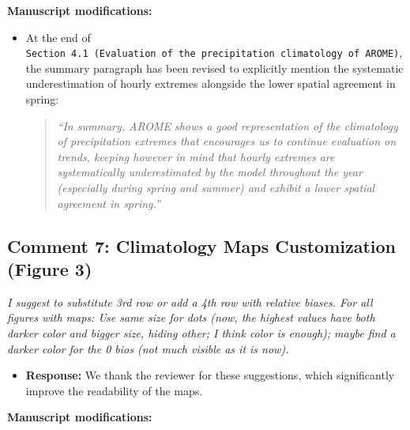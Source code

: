 \documentclass[
  letterpaper,
  DIV=11,
  numbers=noendperiod]{scrartcl}
\providecommand{\tightlist}{%
  \setlength{\itemsep}{0pt}\setlength{\parskip}{0pt}}\usepackage{longtable,booktabs,array}
\begin{document}
\textbf{Manuscript modifications:}

\begin{itemize}
\item
  At the end of
  \texttt{Section\ 4.1\ (Evaluation\ of\ the\ precipitation\ climatology\ of\ AROME)},
  the summary paragraph has been revised to explicitly mention the
  systematic underestimation of hourly extremes alongside the lower
  spatial agreement in spring:

  \begin{quote}
  \emph{``In summary, AROME shows a good representation of the
  climatology of precipitation extremes that encourages us to continue
  evaluation on trends, keeping however in mind that hourly extremes are
  systematically underestimated by the model throughout the year
  (especially during spring and summer) and exhibit a lower spatial
  agreement in spring.''}
  \end{quote}
\end{itemize}

\subsection{Comment 7: Climatology Maps Customization (Figure
3)}\label{comment-7-climatology-maps-customization-figure-3}

\emph{I suggest to substitute 3rd row or add a 4th row with relative
biases. For all figures with maps: Use same size for dots (now, the
highest values have both darker color and bigger size, hiding other; I
think color is enough); maybe find a darker color for the 0 bios (not
much visible as it is now).}

\begin{itemize}
\tightlist
\item
  \textbf{Response:} We thank the reviewer for these suggestions, which
  significantly improve the readability of the maps.
\end{itemize}

\textbf{Manuscript modifications:}
\end{document}
